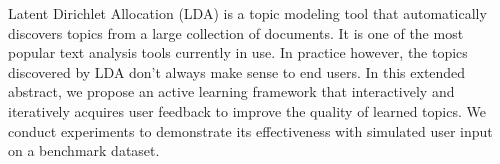 Latent Dirichlet Allocation (LDA) is a topic modeling tool that  automatically discovers topics from a large collection of documents. It  is one of the most popular text analysis tools currently in use. In practice however, the topics discovered by LDA don't always make sense to end users. In this extended abstract, we propose an active learning framework that interactively and iteratively acquires user feedback to improve the quality of learned topics. We conduct experiments to demonstrate its effectiveness with simulated user input on a benchmark dataset.
